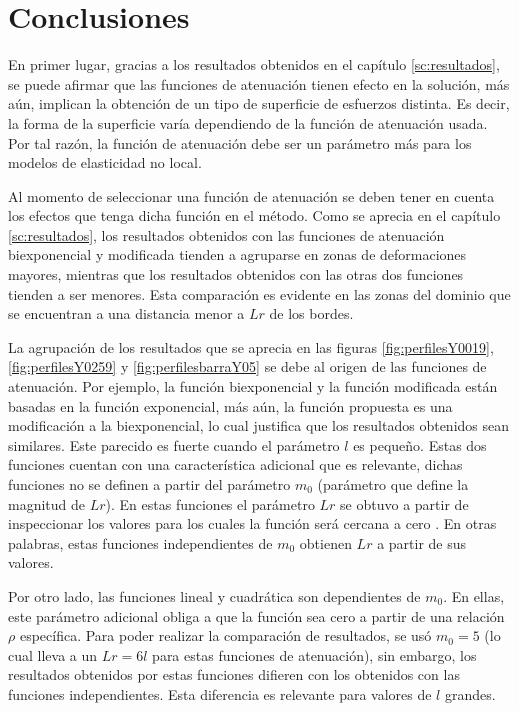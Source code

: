 \begin{comment}

\end{comment}

\section{Conclusiones}
\label{sc:conclusiones}

En primer lugar, gracias a los resultados obtenidos en el capítulo \ref{sc:resultados}, se puede afirmar que las funciones de atenuación tienen efecto en la solución, más aún, implican la obtención de un tipo de superficie de esfuerzos distinta. Es decir, la forma de la superficie varía dependiendo de la función de atenuación usada. Por tal razón, la función de atenuación debe ser un parámetro más para los modelos de elasticidad no local.

Al momento de seleccionar una función de atenuación se deben tener en cuenta los efectos que tenga dicha función en el método. Como se aprecia en el capítulo \ref{sc:resultados}, los resultados obtenidos con las funciones de atenuación biexponencial y modificada tienden a agruparse en zonas de deformaciones mayores, mientras que los resultados obtenidos con las otras dos funciones tienden a ser menores. Esta comparación es evidente en las zonas del dominio que se encuentran a una distancia menor a $Lr$ de los bordes.

La agrupación de los resultados que se aprecia en las figuras \ref{fig:perfilesY0019}, \ref{fig:perfilesY0259} y \ref{fig:perfilesbarraY05} se debe al origen de las funciones de atenuación. Por ejemplo, la función biexponencial y la función modificada están basadas en la función exponencial, más aún, la función propuesta es una modificación a la biexponencial, lo cual justifica que los resultados obtenidos sean similares. Este parecido es fuerte cuando el parámetro $l$ es pequeño. Estas dos funciones cuentan con una característica adicional que es relevante, dichas funciones no se definen a partir del parámetro $m_0$ (parámetro que define la magnitud de $Lr$). En estas funciones el parámetro $Lr$ se obtuvo a partir de inspeccionar los valores para los cuales la función será cercana a cero \parencite{Polizzotto2001}. En otras palabras, estas funciones independientes de $m_0$ obtienen $Lr$ a partir de sus valores.

Por otro lado, las funciones lineal y cuadrática son dependientes de $m_0$. En ellas, este parámetro adicional obliga a que la función sea cero a partir de una relación $\rho$ específica. Para poder realizar la comparación de resultados, se usó $m_0=5$ (lo cual lleva a un $Lr=6l$ para estas funciones de atenuación), sin embargo, los resultados obtenidos por estas funciones difieren con los obtenidos con las funciones independientes. Esta diferencia es relevante para valores de $l$ grandes.

